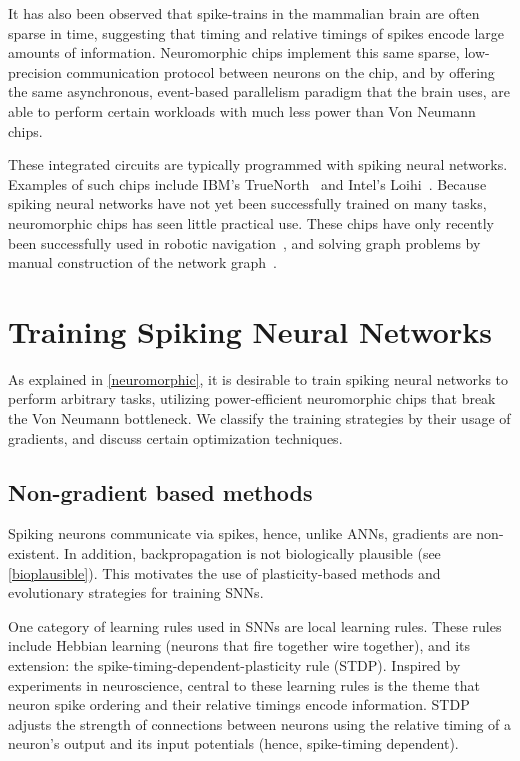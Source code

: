 \documentclass[fyp]{socreport}
\begin{document}
It has also been observed that spike-trains in the mammalian brain are often
sparse in time, suggesting that timing and relative timings of spikes encode
large amounts of information. Neuromorphic chips implement this same sparse,
low-precision communication protocol between neurons on the chip, and by
offering the same asynchronous, event-based parallelism paradigm that the brain
uses, are able to perform certain workloads with much less power than Von
Neumann chips.

These integrated circuits are typically programmed with spiking neural
networks. Examples of such chips include IBM's TrueNorth~\cite{Merolla668} and
Intel's Loihi~\cite{davies2018loihi}. Because spiking neural networks have not
yet been successfully trained on many tasks, neuromorphic chips has seen little
practical use. These chips have only recently been successfully used in robotic
navigation~\cite{SnnSlam}, and solving graph problems by manual construction of
the network graph~\cite{Severa2016SpikingNA}.

\section{Training Spiking Neural Networks\label{sec:train-spik-neur}}

As explained in \autoref{neuromorphic}, it is desirable to train spiking neural
networks to perform arbitrary tasks, utilizing power-efficient neuromorphic
chips that break the Von Neumann bottleneck. We classify the training strategies
by their usage of gradients, and discuss certain optimization techniques.

\subsection{Non-gradient based methods}

Spiking neurons communicate via spikes, hence, unlike ANNs, gradients are
non-existent. In addition, backpropagation is not biologically plausible (see
\autoref{bioplausible}). This motivates the use of plasticity-based methods and
evolutionary strategies for training SNNs.

One category of learning rules used in SNNs are local learning rules.  These
rules include Hebbian learning (neurons that fire together wire together), and
its extension: the spike-timing-dependent-plasticity rule (STDP). Inspired by
experiments in neuroscience, central to these learning rules is the theme that
neuron spike ordering and their relative timings encode information. STDP
adjusts the strength of connections between neurons using the relative timing of
a neuron's output and its input potentials (hence, spike-timing dependent).
\end{document}
